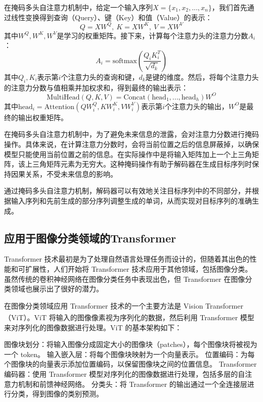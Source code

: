 在掩码多头自注意力机制中，给定一个输入序列$X = \{x_1, x_2, ..., x_n\}$，我们首先通过线性变换得到查询（Query）、键（Key）和值（Value）的表示：
\begin{equation}
Q = XW^Q, \ K = XW^K, \ V = XW^V
\end{equation}
其中$W^Q, W^K, W^V$是学习的权重矩阵。接下来，计算每个注意力头的注意力分数$A_i$：
\begin{equation}
A_i = \text{softmax}(\frac{Q_iK_i^T}{\sqrt{d_k}})
\end{equation}
其中$Q_i, K_i$表示第$i$个注意力头的查询和键，$d_k$是键的维度。然后，将每个注意力头的注意力分数与值相乘并加权求和，得到最终的输出表示：
\begin{equation}
\text{MultiHead}(Q, K, V) = \text{Concat}(\text{head}_1, ..., \text{head}_h)W^O
\end{equation}
其中$\text{head}_i = \text{Attention}(QW_i^Q, KW_i^K, VW_i^V)$表示第$i$个注意力头的输出，$W^O$是最终的输出权重矩阵。

在掩码多头自注意力机制中，为了避免未来信息的泄露，会对注意力分数进行掩码操作。具体来说，在计算注意力分数时，会将当前位置之后的信息屏蔽掉，以确保模型只能使用当前位置之前的信息。在实际操作中是将输入矩阵加上一个上三角矩阵，该上三角矩阵元素为无穷大。这种掩码操作有助于解码器在生成目标序列时保持因果关系，不受未来信息的影响。

通过掩码多头自注意力机制，解码器可以有效地关注目标序列中的不同部分，并根据输入序列和先前生成的部分序列调整生成的单词，从而实现对目标序列的准确生成。
\subsection{应用于图像分类领域的Transformer}
Transformer 技术最初是为了处理自然语言处理任务而设计的，但随着其出色的性能和可扩展性，人们开始将 Transformer 技术应用于其他领域，包括图像分类。虽然传统的卷积神经网络在图像分类任务中表现出色，但 Transformer 在图像分类领域也展示出了很好的潜力。

在图像分类领域应用 Transformer 技术的一个主要方法是 Vision Transformer（ViT）\textsuperscript{\cite{dosovitskiy2020image}}。ViT 将输入的图像像素视为序列化的数据，然后利用 Transformer 模型来对序列化的图像数据进行处理。ViT 的基本架构如下：

图像块划分：将输入图像分成固定大小的图像块（patches），每个图像块将被视为一个 token。
输入嵌入层：将每个图像块映射为一个向量表示。
位置编码：为每个图像块的向量表示添加位置编码，以保留图像块之间的位置信息。
Transformer 编码器：使用 Transformer 模型对序列化的图像数据进行处理，包括多层的自注意力机制和前馈神经网络。
分类头：将 Transformer 的输出通过一个全连接层进行分类，得到图像的类别预测。

